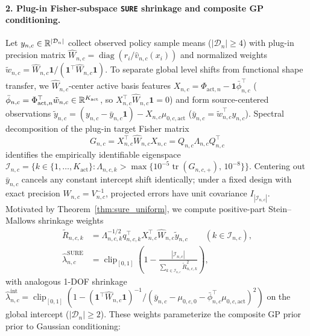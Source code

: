 \paragraph{2. Plug-in Fisher-subspace \texttt{SURE} shrinkage and composite GP conditioning.}
Let $y_{n,c} \in \mathbb{R}^{|\mathcal{D}_n|}$ collect observed policy sample means ($|\mathcal{D}_n| \ge 4$) with plug-in precision matrix $\hat{W}_{n,c} = \operatorname{diag}(r_i / \hat{v}_{n,c}(x_i))$ and normalized weights $\tilde{w}_{n,c} = \hat{W}_{n,c}\mathbf{1} / (\mathbf{1}^\top \hat{W}_{n,c}\mathbf{1})$. To separate global level shifts from functional shape transfer, we $\hat{W}_{n,c}$-center active basis features $X_{n,c} = \Phi_{\mathrm{act},n} - \mathbf{1}\bar{\phi}_{n,c}^\top$ ($\bar{\phi}_{n,c} = \Phi_{\mathrm{act},n}^\top \tilde{w}_{n,c} \in \mathbb{R}^{K_{\mathrm{act}}}$, so $X_{n,c}^\top \hat{W}_{n,c}\mathbf{1} = 0$) and form source-centered observations $\tilde{y}_{n,c} = (y_{n,c} - \bar{y}_{n,c}\mathbf{1}) - X_{n,c}\mu_{0,c,\mathrm{act}}$ ($\bar{y}_{n,c} = \tilde{w}_{n,c}^\top y_{n,c}$). Spectral decomposition of the plug-in target Fisher matrix
\begin{equation}\label{eq:fisher_whitening}
  G_{n,c} = X_{n,c}^\top \hat{W}_{n,c} X_{n,c} = Q_{n,c}\Lambda_{n,c}Q_{n,c}^\top
\end{equation}
identifies the empirically identifiable eigenspace $\mathcal{I}_{n,c} = \{k \in \{1,\dots,K_{\mathrm{act}}\} : \Lambda_{n,c,k} > \max\{10^{-5}\operatorname{tr}(G_{n,c,+}),\, 10^{-8}\}\}$. Centering out $\bar{y}_{n,c}$ cancels any constant intercept shift identically; under a fixed design with exact precision $\hat{W}_{n,c} = V_{n,c}^{-1}$, projected errors have unit covariance $I_{|\mathcal{I}_{n,c}|}$. Motivated by Theorem~\ref{thm:sure_uniform}, we compute positive-part Stein--Mallows shrinkage weights
\begin{equation}\label{eq:sure_closed_form}
  \begin{aligned}
    \tilde{R}_{n,c,k} &= \Lambda_{n,c,k}^{-1/2} q_{n,c,k}^\top X_{n,c}^\top \hat{W}_{n,c} \tilde{y}_{n,c} \qquad (k \in \mathcal{I}_{n,c}), \\
    \hat{\lambda}_{n,c}^{\mathrm{SURE}} &= \operatorname{clip}_{[0,1]}\!\left(1 - \frac{|\mathcal{I}_{n,c}|}{\sum_{k \in \mathcal{I}_{n,c}} \tilde{R}_{n,c,k}^2}\right),
  \end{aligned}
\end{equation}
with analogous 1-DOF shrinkage $\hat{\lambda}_{n,c}^{\mathrm{int}} = \operatorname{clip}_{[0,1]}(1 - (\mathbf{1}^\top \hat{W}_{n,c}\mathbf{1})^{-1}/(\bar{y}_{n,c} - \mu_{0,c,0} - \bar{\phi}_{n,c}^\top\mu_{0,c,\mathrm{act}})^2)$ on the global intercept ($|\mathcal{D}_n| \ge 2$). These weights parameterize the composite GP prior prior to Gaussian conditioning:
